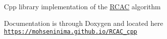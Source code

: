 Cpp library implementation of the \hyperlink{class_r_c_a_c}{R\+C\+AC} algorithm

Documentation is through Doxygen and located here \href{https://mohseninima.github.io/RCAC_cpp}{\tt https\+://mohseninima.\+github.\+io/\+R\+C\+A\+C\+\_\+cpp} 